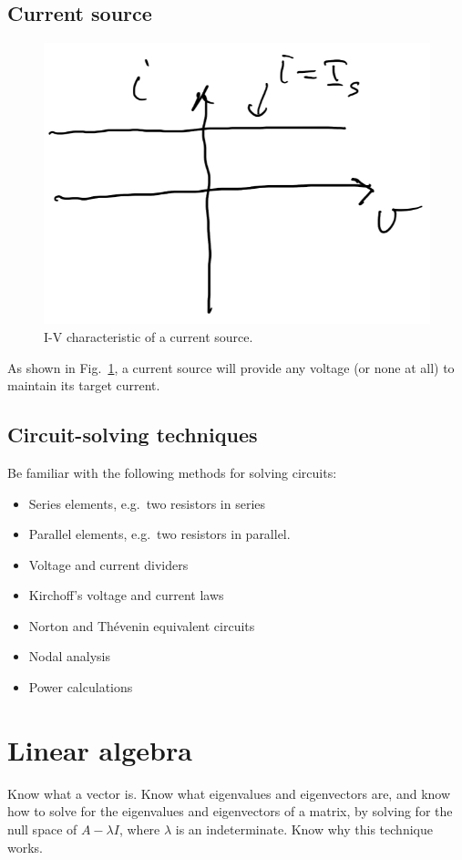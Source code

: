 \subsection{Current source}
\begin{figure}
  \centering
  \includegraphics[width=0.4\linewidth]{figures/IV-current-source}
  \caption{I-V characteristic of a current source.}
  \label{figure:circuit-review:IV-CS}
\end{figure}
As shown in Fig.~\ref{figure:circuit-review:IV-CS},
a current source will provide any voltage (or none at all) to
maintain its target current.

\subsection{Circuit-solving techniques}
Be familiar with the following methods for solving circuits:
\begin{itemize}
  \item Series elements, e.g.~two resistors in series
  \item Parallel elements, e.g.~two resistors in parallel.
  \item Voltage and current dividers
  \item Kirchoff's voltage and current laws
  \item Norton and Th\'evenin equivalent circuits
  \item Nodal analysis
  \item Power calculations
\end{itemize}

\section{Linear algebra}
Know what a vector is. Know what eigenvalues and eigenvectors are,
and know how to solve for the eigenvalues and eigenvectors of a matrix,
by solving for the null space of \(A - \lambda I\), where
\(\lambda\) is an indeterminate. Know why this technique works.
